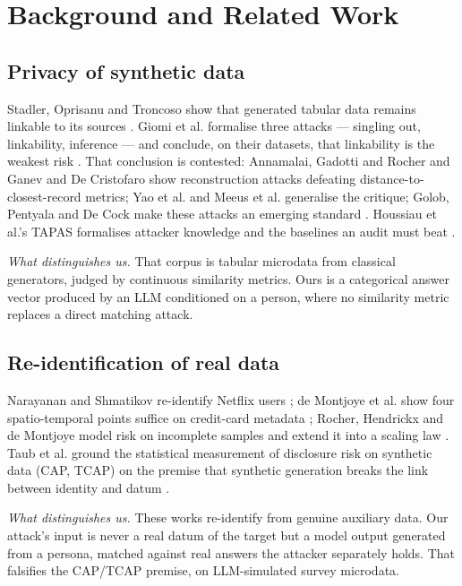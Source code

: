 \documentclass[sigconf,anonymous,review]{acmart}
\begin{document}
\section{Background and Related Work}

\subsection{Privacy of synthetic data}

Stadler, Oprisanu and Troncoso show that generated tabular data remains linkable to its sources \cite{stadler2022groundhog}. Giomi et al. formalise three attacks --- singling out, linkability, inference --- and conclude, on their datasets, that linkability is the weakest risk \cite{giomi2023unified}. That conclusion is contested: Annamalai, Gadotti and Rocher \cite{annamalai2024linear} and Ganev and De Cristofaro \cite{ganev2025inadequacy,ganev2026rethinking,ganev2024regulatory} show reconstruction attacks defeating distance-to-closest-record metrics; Yao et al. \cite{yao2025dcr} and Meeus et al. \cite{meeus2023achilles} generalise the critique; Golob, Pentyala and De Cock make these attacks an emerging standard \cite{golob2026sok}. Houssiau et al.'s TAPAS formalises attacker knowledge and the baselines an audit must beat \cite{houssiau2022tapas}.

\textit{What distinguishes us.} That corpus is tabular microdata from classical generators, judged by continuous similarity metrics. Ours is a categorical answer vector produced by an LLM conditioned on a person, where no similarity metric replaces a direct matching attack.

\subsection{Re-identification of real data}

Narayanan and Shmatikov re-identify Netflix users \cite{narayanan2008robust}; de Montjoye et al. show four spatio-temporal points suffice on credit-card metadata \cite{demontjoye2015unique}; Rocher, Hendrickx and de Montjoye model risk on incomplete samples \cite{rocher2019estimating} and extend it into a scaling law \cite{rocher2025scaling}. Taub et al. ground the statistical measurement of disclosure risk on synthetic data (CAP, TCAP) on the premise that synthetic generation breaks the link between identity and datum \cite{taub2018differential}.

\textit{What distinguishes us.} These works re-identify from genuine auxiliary data. Our attack's input is never a real datum of the target but a model output generated from a persona, matched against real answers the attacker separately holds. That falsifies the CAP/TCAP premise, on LLM-simulated survey microdata.
\end{document}
